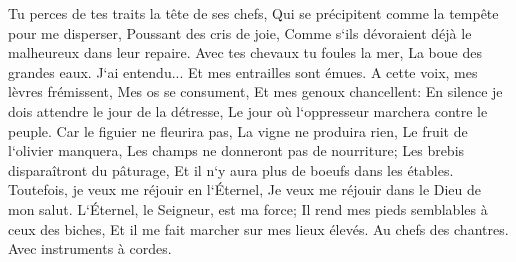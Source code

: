 \verse Tu perces de tes traits la tête de ses chefs, Qui se précipitent comme la tempête pour me disperser, Poussant des cris de joie, Comme s`ils dévoraient déjà le malheureux dans leur repaire. 
\verse Avec tes chevaux tu foules la mer, La boue des grandes eaux. 
\verse J`ai entendu... Et mes entrailles sont émues. A cette voix, mes lèvres frémissent, Mes os se consument, Et mes genoux chancellent: En silence je dois attendre le jour de la détresse, Le jour où l`oppresseur marchera contre le peuple. 
\verse Car le figuier ne fleurira pas, La vigne ne produira rien, Le fruit de l`olivier manquera, Les champs ne donneront pas de nourriture; Les brebis disparaîtront du pâturage, Et il n`y aura plus de boeufs dans les étables. 
\verse Toutefois, je veux me réjouir en l`Éternel, Je veux me réjouir dans le Dieu de mon salut. 
\verse L`Éternel, le Seigneur, est ma force; Il rend mes pieds semblables à ceux des biches, Et il me fait marcher sur mes lieux élevés. Au chefs des chantres. Avec instruments à cordes. 
